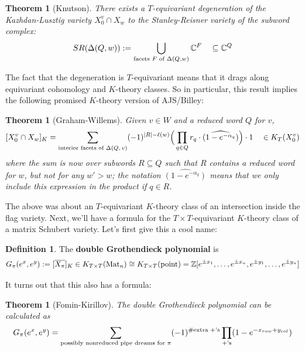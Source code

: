 \documentclass[12pt]{amsart}
\numberwithin{equation}{section}
\newtheorem{Theorem}[equation]{Theorem}
\theoremstyle{definition}
\newtheorem{Definition}[equation]{Definition}
\numberwithin{figure}{section}
\begin{document}
\begin{Theorem}[Knutson] There exists a $T$-equivariant degeneration of the Kazhdan-Lusztig variety $X_0^v \cap X_w$ to the Stanley-Reisner variety of the subword complex:
\[ SR(\Delta(Q,w)) := \bigcup_{\textup{facets $F$ of }\Delta(Q,w)} \mathbb{C}^F \quad \subseteq \mathbb{C}^Q\]
\end{Theorem}

The fact that the degeneration is $T$-equivariant means that it drags along equivariant cohomology and $K$-theory classes. So in particular, this result implies the following promised $K$-theory version of AJS/Billey:
\begin{Theorem}[Graham-Willems]
Given $v\in W$ and a reduced word $Q$ for $v$,
\[ [ X_0^v \cap X_w]_K = \sum_{\textup{interior facets of $\Delta(Q,v)$}} (-1)^{|R|-\ell(w)}\Big(\prod_{q\in Q}r_q\cdot  \widehat{(1-e^{-\alpha_q})}\Big)\cdot 1 \quad \in K_T(X_0^v)\]
where the sum is now over subwords $R\subseteq Q$ such that $R$ contains a reduced word for $w$, but not for any $w' > w$; the notation $\widehat{(1-e^{-\alpha_q})}$ means that we only include this expression in the product if $q\in R$. 
\end{Theorem}

The above was about an $T$-equivariant $K$-theory class of an intersection inside the flag variety. Next, we'll have a formula for the $T\times T$-equivariant $K$-theory class of a matrix Schubert variety. Let's first give this a cool name:

\begin{Definition}
The \textbf{double Grothendieck polynomial} is 
\[ G_\pi(e^x, e^y) := [ \overline{X_\pi}]_K \in K_{T\times T}(\textup{Mat}_n) \cong K_{T\times T}(\textup{point}) = \mathbb{Z}[e^{\pm x_1}, \dots, e^{\pm x_n}, e^{\pm y_1}, \dots, e^{\pm y_n}]\]
\end{Definition}

\noindent It turns out that this also has a formula:

\begin{Theorem}[Fomin-Kirillov]
The double Grothendieck polynomial can be calculated as
\[G_\pi(e^x,e^y) = \sum_{\textup{possibly nonreduced pipe dreams for $\pi$}} (-1)^{\# \textup{extra $+$'s}} \prod_{+\textup{'s}} (1-e^{-x_{row} + y_{col}})\]
\end{Theorem}
\end{document}

